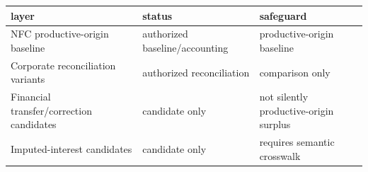 
\begin{tabular}{lll}
\toprule
layer & status & safeguard\\
\midrule
NFC productive-origin baseline & authorized baseline/accounting & productive-origin baseline\\
Corporate reconciliation variants & authorized reconciliation & comparison only\\
Financial transfer/correction candidates & candidate only & not silently productive-origin surplus\\
Imputed-interest candidates & candidate only & requires semantic crosswalk\\
\bottomrule
\end{tabular}
